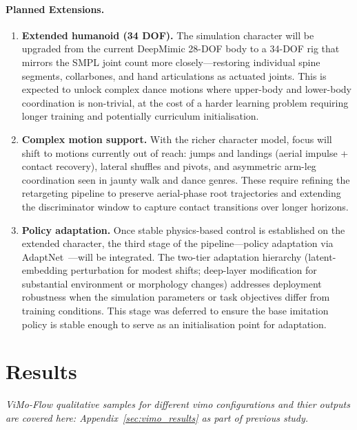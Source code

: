 \paragraph{Planned Extensions.}

\begin{enumerate}
    \item \textbf{Extended humanoid (34 DOF).} The simulation character will be upgraded from the current DeepMimic 28-DOF body to a 34-DOF rig that mirrors the SMPL joint count more closely---restoring individual spine segments, collarbones, and hand articulations as actuated joints. This is expected to unlock complex dance motions where upper-body and lower-body coordination is non-trivial, at the cost of a harder learning problem requiring longer training and potentially curriculum initialisation.

    \item \textbf{Complex motion support.} With the richer character model, focus will shift to motions currently out of reach: jumps and landings (aerial impulse + contact recovery), lateral shuffles and pivots, and asymmetric arm-leg coordination seen in jaunty walk and dance genres. These require refining the retargeting pipeline to preserve aerial-phase root trajectories and extending the discriminator window to capture contact transitions over longer horizons.

    \item \textbf{Policy adaptation.} Once stable physics-based control is established on the extended character, the third stage of the pipeline---policy adaptation via AdaptNet~\cite{adaptnet2023}---will be integrated. The two-tier adaptation hierarchy (latent-embedding perturbation for modest shifts; deep-layer modification for substantial environment or morphology changes) addresses deployment robustness when the simulation parameters or task objectives differ from training conditions. This stage was deferred to ensure the base imitation policy is stable enough to serve as an initialisation point for adaptation.
\end{enumerate}


\vspace{5em}
\section{Results}
\label{sec:results}

\noindent\textit{ViMo-Flow qualitative samples for different vimo configurations and thier outputs are covered here: Appendix~\ref{sec:vimo_results} as part of previous study.}\par

